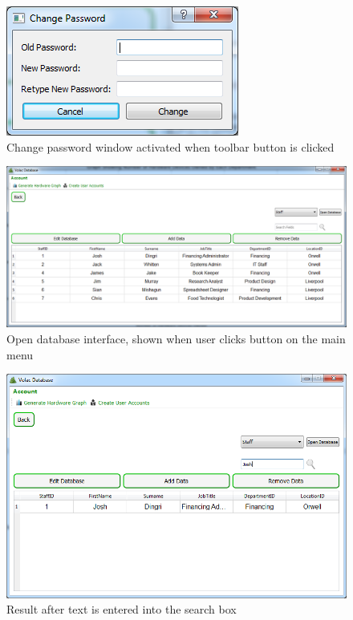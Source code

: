 \begin{figure}[H]
    \includegraphics[width=\textwidth]{./Maintenance/Images/changepassword.png}
    \caption{Change password window activated when toolbar button is clicked} \label{fig:changepassword}
\end{figure}

\begin{figure}[H]
    \includegraphics[width=\textwidth]{./Maintenance/Images/opendb.png}
    \caption{Open database interface, shown when user clicks button on the main menu} \label{fig:opendb}
\end{figure}

\begin{figure}[H]
    \includegraphics[width=\textwidth]{./Maintenance/Images/Searched.png}
    \caption{Result after text is entered into the search box} \label{fig:Searched}
\end{figure}

